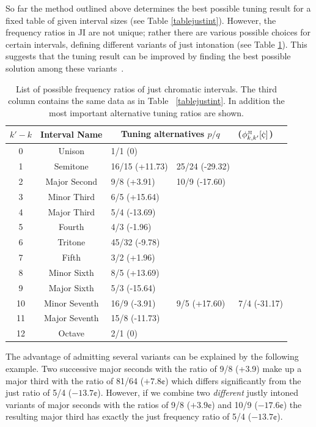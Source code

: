  
So far the method outlined above determines the best possible tuning result for a fixed table of given interval sizes (see Table \ref{tablejustint}). However, the frequency ratios in JI are not unique; rather there are various possible choices for certain intervals, defining different variants of just intonation (see Table \ref{tableseveralintervalstablejustint}). This suggests that the tuning result can be improved by finding the best possible solution among these variants~\cite{Duffin}.

\begin{table}
\centering
\footnotesize
\begin{tabular}{|c|c||l|l|l|} \hline
$k'-k$ & Interval Name & \multicolumn{3}{|c|}{Tuning alternatives $p/q$ \ \ \ ($\phi^\JI_{k,k'}[\cent]$)} \\ \hline
0 & Unison 		& 1/1 (0)	&		&		\\
1 & Semitone 		& 16/15 (+11.73)& 25/24 (-29.32)&		\\
2 & Major Second 	& 9/8 (+3.91)	& 10/9 (-17.60)	&		\\
3 & Minor Third 	& 6/5 (+15.64)	&		&		\\
4 & Major Third 	& 5/4 (-13.69)	&		&		\\
5 & Fourth 		& 4/3 (-1.96)	&		& 		\\
6 & Tritone 		& 45/32 (-9.78) &		&		\\
7 & Fifth 		& 3/2 (+1.96)	&		&		\\
8 & Minor Sixth 	& 8/5 (+13.69)	&		&		\\
9 & Major Sixth 	& 5/3 (-15.64)	&	 	& 		\\
10 & Minor Seventh 	& 16/9 (-3.91)	& 9/5 (+17.60)	& 7/4 (-31.17)	\\
11 & Major Seventh 	& 15/8 (-11.73) &		&		\\
12 & Octave 		& 2/1 (0)	&		&		\\
\hline 
\end{tabular}
\caption{\label{tableseveralintervalstablejustint} List of possible frequency ratios of just chromatic intervals. The third column contains the same data as in Table ~\ref{tablejustint}. In addition the most important alternative tuning ratios are shown.}
\end{table}

The advantage of admitting several variants can be explained by the following example. Two successive major seconds with the ratio of 9/8 (+3.9\cent) make up a major third with the ratio of 81/64 ($+7.8\cent$) which differs significantly from the just ratio of 5/4 ($-13.7\cent$). However, if we combine two \textit{different} justly intoned variants of major seconds with the ratios of 9/8 ($+3.9\cent$) and 10/9 ($-17.6 \cent$) the resulting major third has exactly the just frequency ratio of 5/4 ($-13.7\cent$).

